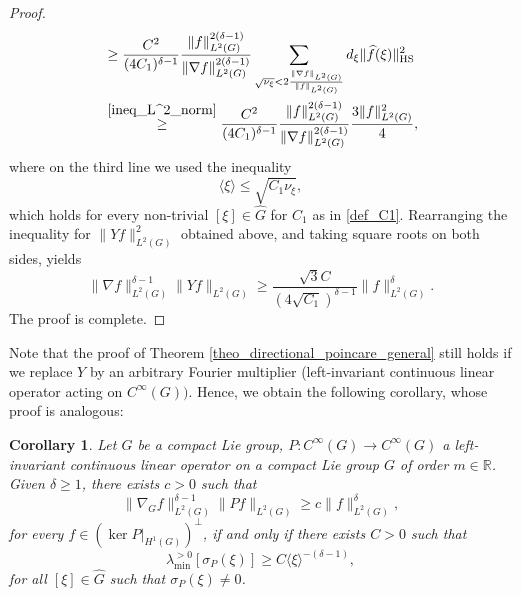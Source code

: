 \documentclass[11pt]{amsart}
\numberwithin{theorem}{section}
\numberwithin{equation}{section}
\newtheorem{corollary}[theorem]{Corollary}
\theoremstyle{definition}
\numberwithin{example}{section}
\theoremstyle{definition}
\theoremstyle{definition}
\newcommand{\R}{\mathbb{R}}
\newcommand{\HS}{\operatorname{HS}}
\begin{document}
\begin{proof}
\begin{align*}
        &\geq  \frac{C^2}{(4C_1)^{\delta-1}}\frac{\|f\|_{L^2(G)}^{2(\delta-1)}}{\|\nabla f\|_{L^2(G)}^{2(\delta-1)}}\sum_{\substack{\\
        \sqrt{\nu_\xi} < 2\frac{\|\nabla f\|_{L^2(G)}}{\|f\|_{L^2(G)}}}}d_\xi \|\widehat{f}(\xi)\|_{\HS}^2\\
        &\stackrel{\eqref{ineq_L^2_norm}}{\geq}  \frac{C^2}{(4C_1)^{\delta-1}}\frac{\|f\|_{L^2(G)}^{2(\delta-1)}}{\|\nabla f\|_{L^2(G)}^{2(\delta-1)}}\frac{3\|f\|_{L^2(G)}^2}{4},
\end{align*}
where on the third line we used the inequality 
\begin{equation*}
    \langle \xi \rangle \leq \sqrt{C_1\nu_\xi},
\end{equation*}
which holds for every non-trivial $[\xi]\in\widehat{G}$ for $C_1$ as in \eqref{def_C1}. Rearranging the inequality for $\|Yf\|_{L^2(G)}^2$ obtained above, and taking square roots on both sides, yields
\begin{equation*}
   \|\nabla f\|_{L^2(G)}^{\delta-1} \|Yf\|_{L^2(G)}\geq \frac{\sqrt{3}C}{(4\sqrt{C_1})^{\delta-1}}\|f\|_{L^2(G)}^\delta.
\end{equation*}
The proof is complete.
\end{proof}

























Note that the proof of Theorem \ref{theo_directional_poincare_general}  still holds if we replace $Y$ by an arbitrary Fourier multiplier (left-invariant continuous linear operator acting on $C^\infty(G))$. Hence, we obtain the following corollary, whose proof is analogous:


\begin{corollary}\label{coro_poincare_multipliers}
     Let $G$ be a compact Lie group, $P:C^\infty(G)\to C^\infty(G)$ a  left-invariant continuous linear operator on a compact Lie group $G$ of order $m\in\R$. Given $\delta\geq 1$, there exists $c>0$ such that 
    \begin{equation*}
        \|\nabla_{G} f\|_{L^2(G)}^{\delta-1}\| Pf\|_{L^2(G)}\geq c\|f\|_{L^2(G)}^\delta,
    \end{equation*}
    for every $f\in (\ker P|_{H^{1}(G)})^\perp$, if and only if there exists $C>0$ such that
\begin{equation}\label{ineq_diof_multipliers}
        \lambda_{\min}^{>0}[\sigma_P(\xi)]\geq C\langle \xi \rangle^{-(\delta-1)},
    \end{equation}
    for all $[\xi]\in\widehat{G}$ such that $\sigma_P(\xi)\neq 0$.
\end{corollary}
\end{document}
